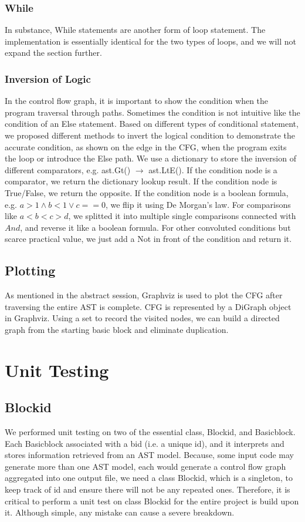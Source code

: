 \documentclass[11pt]{article}
\begin{document}
\subsubsection{While}
In substance, While statements are another form of loop statement. The implementation is essentially identical for the two types of loops, and we will not expand the section further. 


\subsubsection{Inversion of Logic}
In the control flow graph, it is important to show the condition when the program traversal through paths. Sometimes the condition is not intuitive like the condition of an Else statement. Based on different types of conditional statement, we proposed different methods to invert the logical condition to demonstrate the accurate condition, as shown on the edge in the CFG, when the program exits the loop or introduce the Else path. We use a dictionary to store the inversion of different comparators, e.g. ast.Gt() $\rightarrow$ ast.LtE(). If the condition node is a comparator, we return the dictionary lookup result. If the condition node is True/False, we return the opposite. If the condition node is a boolean formula, e.g. $a>1 \land b<1 \lor c==0$, we flip it using De Morgan's law. For comparisons like $a < b < c > d$, we splitted it into multiple single comparisons connected with $And$, and reverse it like a boolean formula.  For other convoluted conditions but scarce practical value, we just add a Not in front of the condition and return it.

\subsection{Plotting}
As mentioned in the abstract session, Graphviz is used to plot the CFG after traversing the entire AST is complete. CFG is represented by a DiGraph object in Graphviz. Using a set to record the visited nodes, we can build a directed graph from the starting basic block and eliminate duplication.

\section{Unit Testing}\label{Unit Testing}
\subsection{Blockid}
We performed unit testing on two of the essential class, Blockid, and Basicblock. Each Basicblock associated with a bid (i.e. a unique id), and it interprets and stores information retrieved from an AST model. Because, some input code may generate more than one AST model, each would generate a control flow graph aggregated into one output file, we need a class Blockid, which is a singleton, to keep track of id and ensure there will not be any repeated ones. Therefore, it is critical to perform a unit test on class Blockid for the entire project is build upon it. Although simple, any mistake can cause a severe breakdown.
\end{document}
